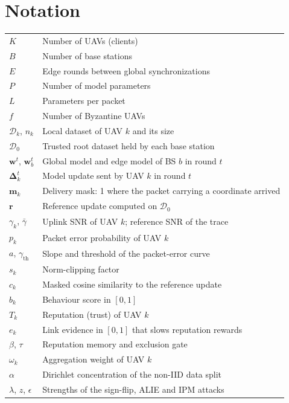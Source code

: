 \section*{Notation}
\begin{longtable}{@{}p{32mm}p{122mm}@{}}
$K$ & Number of UAVs (clients) \\
$B$ & Number of base stations \\
$E$ & Edge rounds between global synchronizations \\
$P$ & Number of model parameters \\
$L$ & Parameters per packet \\
$f$ & Number of Byzantine UAVs \\
$\mathcal{D}_k$, $n_k$ & Local dataset of UAV $k$ and its size \\
$\mathcal{D}_0$ & Trusted root dataset held by each base station \\
$\mathbf{w}^t$, $\mathbf{w}^t_b$ & Global model and edge model of BS $b$ in round $t$ \\
$\boldsymbol{\Delta}_k^t$ & Model update sent by UAV $k$ in round $t$ \\
$\mathbf{m}_k$ & Delivery mask: 1 where the packet carrying a coordinate arrived \\
$\mathbf{r}$ & Reference update computed on $\mathcal{D}_0$ \\
$\gamma_k$, $\bar\gamma$ & Uplink SNR of UAV $k$; reference SNR of the trace \\
$p_k$ & Packet error probability of UAV $k$ \\
$a$, $\gamma_{\mathrm{th}}$ & Slope and threshold of the packet-error curve \\
$s_k$ & Norm-clipping factor \\
$c_k$ & Masked cosine similarity to the reference update \\
$b_k$ & Behaviour score in $[0,1]$ \\
$T_k$ & Reputation (trust) of UAV $k$ \\
$e_k$ & Link evidence in $[0,1]$ that slows reputation rewards \\
$\beta$, $\tau$ & Reputation memory and exclusion gate \\
$\omega_k$ & Aggregation weight of UAV $k$ \\
$\alpha$ & Dirichlet concentration of the non-IID data split \\
$\lambda$, $z$, $\epsilon$ & Strengths of the sign-flip, ALIE and IPM attacks \\
\end{longtable}
